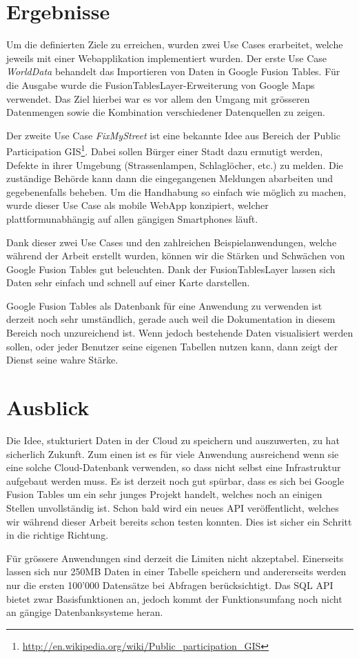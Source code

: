 \section*{Ergebnisse}
Um die definierten Ziele zu erreichen, wurden zwei Use Cases erarbeitet, welche jeweils mit einer Webapplikation implementiert wurden. Der erste Use Case \emph{WorldData} behandelt das Importieren von Daten in Google Fusion Tables. Für die Ausgabe wurde die FusionTablesLayer-Erweiterung von Google Maps verwendet. Das Ziel hierbei war es vor allem den Umgang mit grösseren Datenmengen sowie  die Kombination verschiedener Datenquellen zu zeigen.

Der zweite Use Case \emph{FixMyStreet} ist eine bekannte Idee aus Bereich der Public Participation \gls{GIS}\footnote{\url{http://en.wikipedia.org/wiki/Public_participation_GIS}}. Dabei sollen Bürger einer Stadt dazu ermutigt werden, Defekte in ihrer Umgebung (Strassenlampen, Schlaglöcher, etc.) zu melden. Die zuständige Behörde kann dann die eingegangenen Meldungen abarbeiten und gegebenenfalls beheben. Um die Handhabung so einfach wie möglich zu machen, wurde dieser Use Case als mobile \gls{WebApp} konzipiert, welcher plattformunabhängig auf allen gängigen Smartphones läuft.

Dank dieser zwei Use Cases und den zahlreichen Beispielanwendungen, welche während der Arbeit erstellt wurden, können wir die Stärken und Schwächen von Google Fusion Tables gut beleuchten. Dank der FusionTablesLayer lassen sich Daten sehr einfach und schnell auf einer Karte darstellen.

Google Fusion Tables als Datenbank für eine Anwendung zu verwenden ist derzeit noch sehr umständlich, gerade auch weil die Dokumentation in diesem Bereich noch unzureichend ist. Wenn jedoch bestehende Daten visualisiert werden sollen, oder jeder Benutzer seine eigenen Tabellen nutzen kann, dann zeigt der Dienst seine wahre Stärke.

\section*{Ausblick}
Die Idee, stukturiert Daten in der \gls{Cloud} zu speichern und auszuwerten, zu hat sicherlich Zukunft. Zum einen ist es für viele Anwendung ausreichend wenn sie eine solche \gls{Cloud}-Datenbank verwenden, so dass nicht selbst eine Infrastruktur aufgebaut werden muss. Es ist derzeit noch gut spürbar, dass es sich bei Google Fusion Tables um ein sehr junges Projekt handelt, welches noch an einigen Stellen unvollständig ist. Schon bald wird ein neues API veröffentlicht, welches wir während dieser Arbeit bereits schon testen konnten. Dies ist sicher ein Schritt in die richtige Richtung.

Für grössere Anwendungen sind derzeit die Limiten nicht akzeptabel. Einerseits lassen sich nur 250MB Daten in einer Tabelle speichern und andererseits werden nur die ersten 100'000 Datensätze bei Abfragen berücksichtigt. Das SQL API bietet zwar Basisfunktionen an, jedoch kommt der Funktionsumfang noch nicht an gängige Datenbanksysteme heran.


